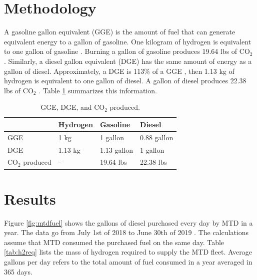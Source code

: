 \documentclass{anstrans}
\begin{document}
\section{Methodology}
\label{method}

A gasoline gallon equivalent (GGE) is the amount of fuel that can generate equivalent energy to a gallon of gasoline. One kilogram of hydrogen is equivalent to one gallon of gasoline \cite{doe_office_of_energy_efficiency_and_renewable_energy_hydrogen_2020}. Burning a gallon of gasoline produces 19.64 lbs of CO$_2$ \cite{us_energy_information_administration_how_2014}. 
Similarly, a diesel gallon equivalent (DGE) has the same amount of energy as a gallon of diesel. Approximately, a DGE is 113\% of a GGE \cite{alternative_fuels_data_center_fuel_2014}, then 1.13 kg of hydrogen is equivalent to one gallon of diesel.
A gallon of diesel produces 22.38 lbs of CO$_2$ \cite{us_energy_information_administration_how_2014}. 
Table \ref{tab:meth} summarizes this information.

\begin{table}[]
	\centering
    \caption{GGE, DGE, and CO$_2$ produced.}
    \label{tab:meth}
	\begin{tabular}{l|lll}
	\hline
	                 & Hydrogen & Gasoline    & Diesel      \\ \hline
	GGE              & 1 kg     & 1 gallon    & 0.88 gallon \\
	DGE              & 1.13 kg  & 1.13 gallon & 1 gallon    \\
    CO$_2$ produced  & -        & 19.64 lbs   & 22.38 lbs   \\ \hline

	\end{tabular}
\end{table}

\section{Results}

Figure \ref{fig:mtdfuel} shows the gallons of diesel purchased every day by MTD in a year. The data go from July 1st of 2018 to June 30th of 2019 \cite{mtd_irecords_2019}. The calculations assume that MTD consumed the purchased fuel on the same day.
Table \ref{tab:h2req} lists the mass of hydrogen required to supply the MTD fleet. Average gallons per day refers to the total amount of fuel consumed in a year averaged in 365 days. 
\end{document}
